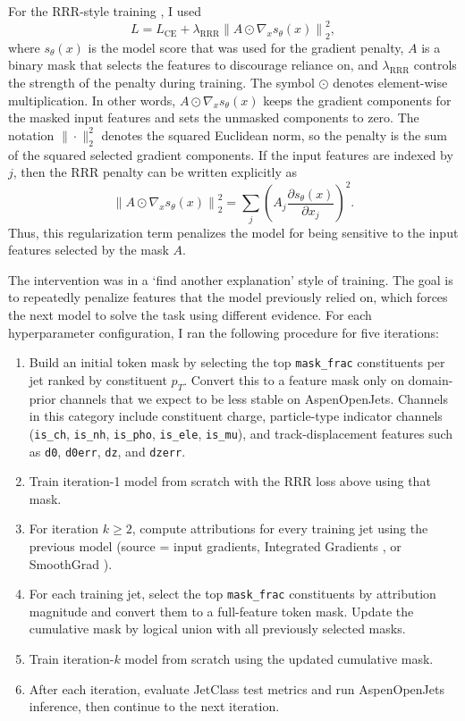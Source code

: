 \documentclass[11pt]{article}
\begin{document}
For the RRR-style training \cite{ross2017right}, I used
\begin{equation}
L = L_{\mathrm{CE}} + \lambda_{\mathrm{RRR}}\left\|A\odot\nabla_x s_\theta(x)\right\|_2^2,
\end{equation}
where $s_\theta(x)$ is the model score that was used for the gradient penalty, $A$ is a binary mask that selects the features to discourage reliance on, and $\lambda_{\mathrm{RRR}}$ controls the strength of the penalty during training. The symbol $\odot$ denotes element-wise multiplication. In other words, $A\odot\nabla_x s_\theta(x)$ keeps the gradient components for the masked input features and sets the unmasked components to zero. The notation $\|\cdot\|_2^2$ denotes the squared Euclidean norm, so the penalty is the sum of the squared selected gradient components. If the input features are indexed by $j$, then the RRR penalty can be written explicitly as
\begin{equation}
\left\|A\odot\nabla_x s_\theta(x)\right\|_2^2
= \sum_j \left(A_j \frac{\partial s_\theta(x)}{\partial x_j}\right)^2 .
\end{equation}
Thus, this regularization term penalizes the model for being sensitive to the input features selected by the mask $A$.

The intervention was in a ‘find another explanation’ style of training. The goal is to repeatedly penalize features that the model previously relied on, which forces the next model to solve the task using different evidence. For each hyperparameter configuration, I ran the following procedure for five iterations:

\begin{enumerate}
\item Build an initial token mask by selecting the top \texttt{mask\_frac} constituents per jet ranked by constituent $p_T$. Convert this to a feature mask only on domain-prior channels that we expect to be less stable on AspenOpenJets. Channels in this category include constituent charge, particle-type indicator channels (\texttt{is\_ch}, \texttt{is\_nh}, \texttt{is\_pho}, \texttt{is\_ele}, \texttt{is\_mu}), and track-displacement features such as \texttt{d0}, \texttt{d0err}, \texttt{dz}, and \texttt{dzerr}.
\item Train iteration-1 model from scratch with the RRR loss above using that mask.
\item For iteration $k\ge 2$, compute attributions for every training jet using the previous model (source = input gradients, Integrated Gradients \cite{sundararajan2017axiomatic}, or SmoothGrad \cite{smilkov2017smoothgrad}).
\item For each training jet, select the top \texttt{mask\_frac} constituents by attribution magnitude and convert them to a full-feature token mask. Update the cumulative mask by logical union with all previously selected masks.
\item Train iteration-$k$ model from scratch using the updated cumulative mask.
\item After each iteration, evaluate JetClass test metrics and run AspenOpenJets inference, then continue to the next iteration.
\end{enumerate}
\end{document}
